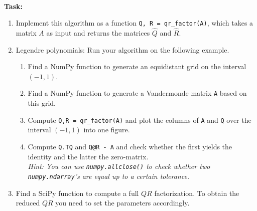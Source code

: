 ~\\
\textbf{Task:} 
\begin{enumerate}
	\item Implement this algorithm as a function \verb|Q, R = qr_factor(A)|, which takes a matrix $A$ as input and returns the matrices $\widehat{Q}$ and $\widehat{R}$.
	\item Legendre polynomials: Run your algorithm on the following example.
	\begin{enumerate}
		\item Find a NumPy function to generate an equidistant grid on the interval $(-1,1)$.
		\item Find a NumPy function to generate a Vandermonde matrix \texttt{A} based on this grid.
		\item Compute \texttt{Q,R = qr\_factor(A)} and plot the columns of \texttt{A} and \texttt{Q} over the interval $(-1,1)$ into one figure.
		\item Compute  \texttt{Q.TQ} and \texttt{Q@R - A}  and check whether the first yields the identity and the latter the zero-matrix.\\
		\textit{Hint:  You can use \texttt{numpy.allclose()} to check whether two \texttt{numpy.ndarray}'s are equal up to a certain tolerance.}
	\end{enumerate} 
	\item Find a SciPy function to compute a full $QR$ factorization. To obtain the reduced $QR$ you need to set the parameters accordingly.
\end{enumerate}

